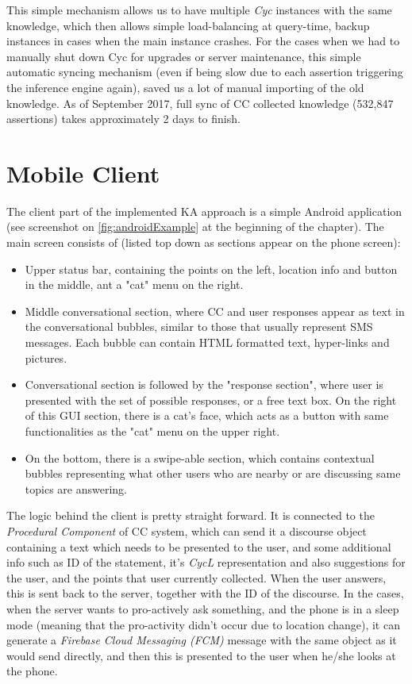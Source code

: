 This simple mechanism allows us to have multiple \emph{Cyc} instances with
the same knowledge, which then allows simple load-balancing at query-time,
backup instances in cases when the main instance crashes. For the cases when
we had to manually shut down Cyc for upgrades or server maintenance, this simple
automatic syncing mechanism (even if being slow due to each assertion triggering
the inference engine again), saved us a lot of manual importing of the old knowledge.
 As of September 2017, full sync of CC collected knowledge (532,847 
assertions) takes approximately 2 days to finish.

\section{Mobile Client}
\label{section:app}
The client part of the implemented KA approach is a simple Android application
(see screenshot on \autoref{fig:androidExample} at the beginning of the chapter).
The main screen consists of (listed top down as sections appear on the phone 
screen):
\begin{itemize}
\item Upper status bar, containing the points on the left, location info and 
button in the middle, ant a "cat" menu on the right.
\item Middle conversational section, where CC and user responses appear as
text in the conversational bubbles, similar to those that usually represent 
SMS messages. Each bubble can contain HTML formatted text, hyper-links and 
pictures.
\item Conversational section is followed by the "response section", where user
is presented with the set of possible responses, or a free text box. On the 
right of this GUI section, there is a cat's face, which acts as a button with
same functionalities as the "cat" menu on the upper right.
\item On the bottom, there is a swipe-able section, which contains contextual
bubbles representing what other users  who are nearby or are discussing same 
topics are answering.
\end{itemize} 

The logic behind the client is pretty straight forward. It is connected to the
\emph{Procedural Component} of CC system, which can send it a discourse object
containing a text which needs to be presented to the user, and some additional 
info such as ID of the statement, it's \emph{CycL} representation and also
suggestions for the user, and the points that user currently collected. When 
the user answers, this is sent back to the server, together with the ID of the 
discourse. In the cases, when the server wants to pro-actively ask something,
and the phone is in a sleep mode (meaning that the pro-activity didn't occur due
to location change), it can generate a \emph{Firebase Cloud Messaging (FCM)}
message with the same object as
it would send directly, and then this is presented to the user when he/she 
looks at the phone.

